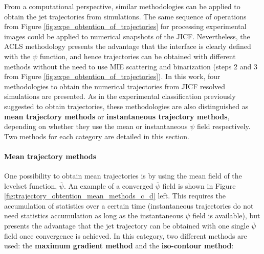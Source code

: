 From a computational perspective, similar methodologies can be applied to obtain the jet trajectories from simulations. The same sequence of operations from Figure \ref{fig:expe_obtention_of_trajectories} for processing experimental images could be applied to numerical snapshots of the JICF. Nevertheless, the ACLS methodology presents the advantage that the interface is clearly defined with the $\psi$ function, and hence trajectories can be obtained with different methods without the need to use MIE scattering and binarization (steps 2 and 3 from Figure \ref{fig:expe_obtention_of_trajectories}). In this work, four methodologies to obtain the numerical trajectories from JICF resolved simulations are presented. As in the experimental classification previously suggested to obtain trajectories, these methodologies are also distinguished as \textbf{mean trajectory methods} or \textbf{instantaneous trajectory methods}, depending on whether they use the mean or instantaneous $\psi$ field respectively. Two methods for each category are detailed in this section.



\paragraph*{Mean trajectory methods}

One possibility to obtain mean trajectories is by using the mean field of the levelset function, $\overline{\psi}$. An example of a converged $\overline{\psi}$ field is shown in Figure \ref{fig:trajectory_obtention_mean_methods_c_d} left. This requires the accumulation of statistics over a certain time (instantaneous trajectories do not need statistics accumulation as long as the instantaneous $\psi$ field is available), but presents the advantage that the jet trajectory can be obtained with one single $\overline{\psi}$ field once convergence is achieved. In this category, two different methods are used: the \textbf{maximum gradient method} and the \textbf{iso-contour method}:


